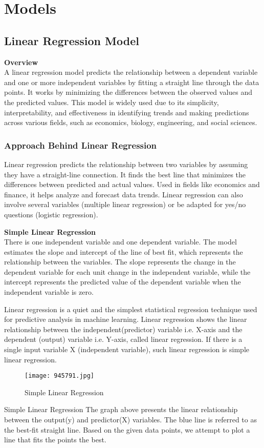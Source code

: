 \documentclass[12pt,a4paper]{report}
\begin{document}
\chapter{Models}
\section{Linear Regression Model}
\textbf{Overview}\\
A linear regression model predicts the relationship between a dependent variable and one or more independent variables by fitting a straight line through the data points. It works by minimizing the differences between the observed values and the predicted values. This model is widely used due to its simplicity, interpretability, and effectiveness in identifying trends and making predictions across various fields, such as economics, biology, engineering, and social sciences.
\subsection{Approach Behind Linear 
Regression}
Linear regression predicts the relationship between two variables by assuming they have a straight-line connection. It finds the best line that minimizes the differences between predicted and actual values. Used in fields like economics and finance, it helps analyze and forecast data trends. Linear regression can also involve several variables (multiple linear regression) or be adapted for yes/no questions (logistic regression).

\textbf{Simple Linear Regression}\\
There is one independent variable and one dependent variable. The model estimates the slope and intercept of the line of best fit, which represents the relationship between the variables. The slope represents the change in the dependent variable for each unit change in the independent variable, while the intercept represents the predicted value of the dependent variable when the independent variable is zero.

Linear regression is a quiet and the simplest statistical regression technique used for predictive analysis in machine learning. Linear regression shows the linear relationship between the independent(predictor) variable i.e. X-axis and the dependent (output) variable i.e. Y-axis, called linear regression. If there is a single input variable X (independent variable), such linear regression is simple linear regression.\\
\begin{figure} [!ht]
    \centering
    \texttt{[image: 945791.jpg]}
    \caption{Simple Linear Regression}
    \label{fig:enter-label}
\end{figure}
 Simple Linear Regression
The graph above presents the linear relationship between the output(y) and predictor(X) variables. The blue line is referred to as the best-fit straight line. Based on the given data points, we attempt to plot a line that fits the points the best.
\end{document}
